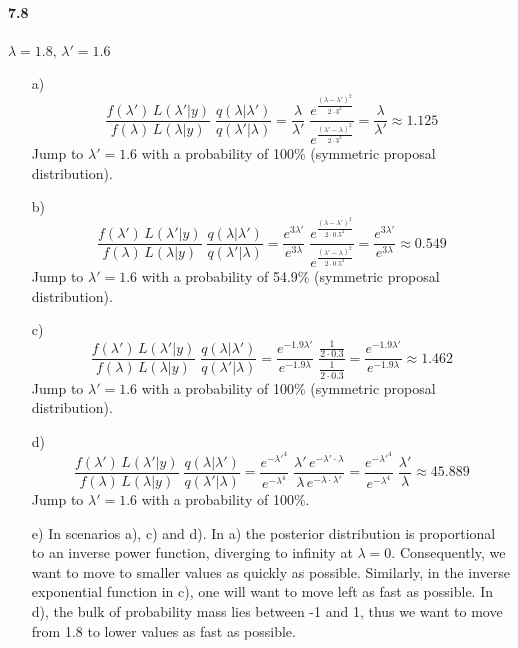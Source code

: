 \documentclass[fontsize=11pt,DIV=18,parskip=half]{scrartcl}
\begin{document}
\paragraph{7.8} $\lambda=1.8, \, \lambda'=1.6$

\begin{enumerate}
\item[a)] $$\frac{f(\lambda') \, L(\lambda'|y)}{f(\lambda) \, L(\lambda|y) } \; \frac{q(\lambda|\lambda')}{q(\lambda'|\lambda)} = \frac{\lambda}{\lambda'} \; \frac{e^{\frac{(\lambda-\lambda')^2}{2 \cdot 3^2}}}{e^{\frac{(\lambda'-\lambda)^2}{2 \cdot 3^2}}} = \frac{\lambda}{\lambda'} \approx 1.125 $$
Jump to $\lambda'=1.6$ with a probability of 100\% (symmetric proposal distribution).

\item[b)] $$\frac{f(\lambda') \, L(\lambda'|y)}{f(\lambda) \, L(\lambda|y) } \; \frac{q(\lambda|\lambda')}{q(\lambda'|\lambda)} = \frac{e^{3\lambda'}}{e^{3\lambda}} \; \frac{e^{\frac{(\lambda-\lambda')^2}{2 \cdot 0.5^2}}}{e^{\frac{(\lambda'-\lambda)^2}{2 \cdot 0.5^2}}} = \frac{e^{3\lambda'}}{e^{3\lambda}} \approx 0.549 $$
Jump to $\lambda'=1.6$ with a probability of 54.9\% (symmetric proposal distribution).

\item[c)] $$\frac{f(\lambda') \, L(\lambda'|y)}{f(\lambda) \, L(\lambda|y) } \; \frac{q(\lambda|\lambda')}{q(\lambda'|\lambda)} = \frac{e^{-1.9 \lambda'}}{e^{-1.9 \lambda}} \; \frac{\frac{1}{2\cdot0.3}}{\frac{1}{2\cdot0.3}} = \frac{e^{-1.9\lambda'}}{e^{-1.9\lambda}} \approx 1.462 $$
Jump to $\lambda'=1.6$ with a probability of 100\% (symmetric proposal distribution).

\item[d)] $$\frac{f(\lambda') \, L(\lambda'|y)}{f(\lambda) \, L(\lambda|y) } \; \frac{q(\lambda|\lambda')}{q(\lambda'|\lambda)} = \frac{e^{-\lambda'^4}}{e^{-\lambda^4}} \; \frac{\lambda' \, e^{-\lambda' \cdot \lambda}}{\lambda \, e^{-\lambda \cdot \lambda'}} = \frac{e^{-\lambda'^4}}{e^{-\lambda^4}} \; \frac{\lambda'}{\lambda} \approx 45.889 $$
Jump to $\lambda'=1.6$ with a probability of 100\%.

\item[e)] In scenarios a), c) and d). In a) the posterior distribution is proportional to an inverse power function, diverging to infinity at $\lambda=0$. Consequently, we want to move to smaller values as quickly as possible. Similarly, in the inverse exponential function in c), one will want to move left as fast as possible. In d), the bulk of probability mass lies between -1 and 1, thus we want to move from 1.8 to lower values as fast as possible.

\end{enumerate}
\end{document}
